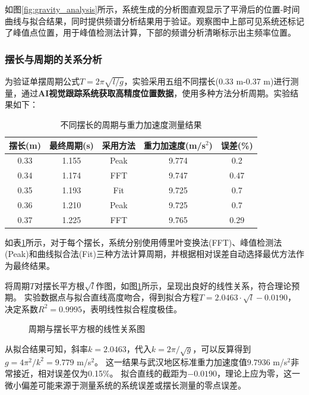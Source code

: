 如图\ref{fig:gravity_analysis}所示，系统生成的分析图直观显示了平滑后的位置-时间曲线与拟合结果，同时提供频谱分析结果用于验证。观察图中上部可见系统还标记了峰值点位置，用于峰值检测法计算，下部的频谱分析清晰标示出主频率位置。

\subsubsection{摆长与周期的关系分析}

为验证单摆周期公式$T = 2\pi\sqrt{l/g}$，实验采用五组不同摆长(0.33 m-0.37 m)进行测量，通过\textbf{AI视觉跟踪系统获取高精度位置数据}，使用多种方法分析周期。实验结果如下：

\begin{table}[H]
\centering
\caption{不同摆长的周期与重力加速度测量结果}
\begin{tabular}{@{}c c c c c@{}}
\toprule
\textbf{摆长(m)} & \textbf{最终周期(s)} & \textbf{采用方法} & \textbf{重力加速度(m/s$^2$)} & \textbf{误差(\%)} \\
\midrule
0.33 & 1.155 & Peak & 9.774 & 0.2 \\
0.34 & 1.174 & FFT & 9.747 & 0.47 \\
0.35 & 1.193 & Fit & 9.725 & 0.7 \\
0.36 & 1.210 & Peak & 9.725 & 0.7 \\
0.37 & 1.225 & FFT & 9.765 & 0.29 \\
\bottomrule
\end{tabular}
\label{tab:lengths_periods}
\end{table}

如表\ref{tab:lengths_periods}所示，对于每个摆长，系统分别使用傅里叶变换法(FFT)、峰值检测法(Peak)和曲线拟合法(Fit)三种方法计算周期，并根据相对误差自动选择最优方法作为最终结果。

将周期$T$对摆长平方根$\sqrt{l}$作图，如图\ref{fig:period_length}所示，呈现出良好的线性关系，符合理论预期。
实验数据点与拟合直线高度吻合，得到拟合方程$T = 2.0463 \cdot \sqrt{l} - 0.0190$，
决定系数$R^2 = 0.9995$，表明线性拟合程度极佳。

\begin{figure}[H]
    \centering
    
    \caption{周期与摆长平方根的线性关系图}
    \label{fig:period_length}
\end{figure}

\begin{SecondaryBox}[周期与摆长平方根的线性关系]
\quad \quad 从拟合结果可知，斜率$k = 2.0463$，代入$k = 2\pi/\sqrt{g}$，可以反算得到$g = 4\pi^2/k^2 = 9.779$ m/s$^2$。
这一结果与武汉地区标准重力加速度值$9.7936$ m/s$^2$非常接近，相对误差仅为0.15\%。
拟合直线的截距为$-0.0190$，理论上应为零，这一微小偏差可能来源于测量系统的系统误差或摆长测量的零点误差。
\end{SecondaryBox}





